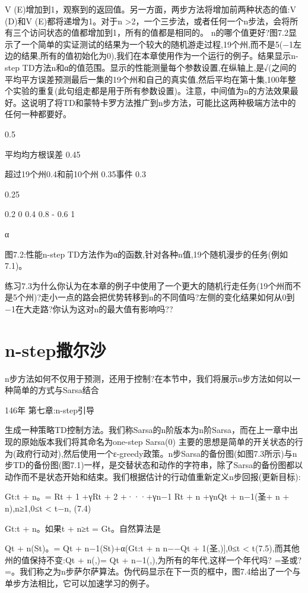 V (E)增加到1，观察到的返回值。另一方面，两步方法将增加前两种状态的值:V (D)和V (E)都将递增为1。对于n >2，一个三步法，或者任何一个n步法，会将所有三个访问状态的值都增加到1，所有的值都是相同的。
n的哪个值更好?图7.2显示了一个简单的实证测试的结果为一个较大的随机游走过程,19个州,而不是5(−1左边的结果,所有的值初始化为0),我们在本章使用作为一个运行的例子。结果显示n-step TD方法n和α的值范围。显示的性能测量每个参数设置,在纵轴上,是√(之间的平均平方误差预测最后一集的19个州和自己的真实值,然后平均在第十集,100年整个实验的重复(此句组走都是用于所有参数设置)。注意，中间值为n的方法效果最好。这说明了将TD和蒙特卡罗方法推广到n步方法，可能比这两种极端方法中的任何一种都要好。
 
0.5



平均均方根误差
0.45



超过19个州0.4和前10个州
0.35事件
0.3



0.25

0.2 0
0.4 					0.8 - 0.6 					1

α

图7.2:性能n-step TD方法作为α的函数,针对各种n值,19个随机漫步的任务(例如7.1)。


练习7.3为什么你认为在本章的例子中使用了一个更大的随机行走任务(19个州而不是5个州)?走小一点的路会把优势转移到n的不同值吗?左侧的变化结果如何从0到−1在大走路?你认为这对n的最大值有影响吗??


\section{ n-step撒尔沙}

n步方法如何不仅用于预测，还用于控制?在本节中，我们将展示n步方法如何以一种简单的方式与Sarsa结合

146年 					第七章:n-step引导



生成一种策略TD控制方法。我们称Sarsa的n阶版本为n阶Sarsa，而在上一章中出现的原始版本我们将其命名为one-step Sarsa(0)
主要的思想是简单的开关状态的行为(政府行动对),然后使用一个ε-greedy政策。n步Sarsa的备份图(如图7.3所示)与n步TD的备份图(图7.1)一样，是交替状态和动作的字符串，除了Sarsa的备份图都以动作而不是状态开始和结束。我们根据估计的行动值重新定义n步回报(更新目标):

Gt:t + n。= Rt + 1 +γRt + 2 +···+γn−1 Rt + n +γnQt + n−1(圣+ n + n),n≥1,0≤t < t−n,
(7.4)

Gt:t + n。如果t + n≥t = Gt。自然算法是

Qt + n(St)。= Qt + n−1(St)+α(Gt:t + n n−−Qt + 1(圣,)],0≤t < t(7.5),而其他州的值保持不变:Qt + n(,)= Qt + n−1(,),为所有的年代,这样一个年代吗? =圣或? =。我们称之为n步萨尔萨算法。伪代码显示在下一页的框中，图7.4给出了一个与单步方法相比，它可以加速学习的例子。


